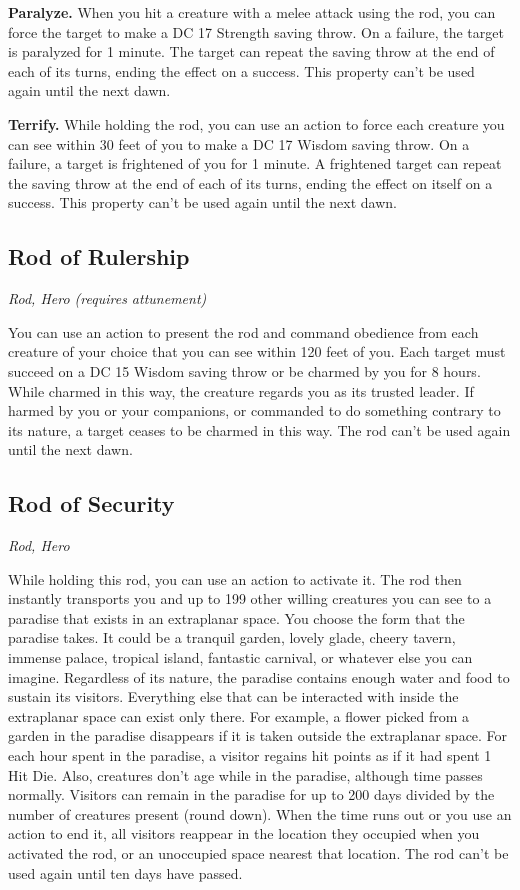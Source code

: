 \textbf{Paralyze.} When you hit a creature with a melee attack using the rod, you can force the target to make a DC 17 Strength saving throw. On a failure, the target is paralyzed for 1 minute. The target can repeat the saving throw at the end of each of its turns, ending the effect on a success. This property can't be used again until the next dawn.

\textbf{Terrify.} While holding the rod, you can use an action to force each creature you can see within 30 feet of you to make a DC 17 Wisdom saving throw. On a failure, a target is frightened of you for 1 minute. A frightened target can repeat the saving throw at the end of each of its turns, ending the effect on itself on a success. This property can't be used again until the next dawn.

\subsection{Rod of Rulership}
\textit{Rod, Hero (requires attunement)}

You can use an action to present the rod and command obedience from each creature of your choice that you can see within 120 feet of you. Each target must succeed on a DC 15 Wisdom saving throw or be charmed by you for 8 hours. While charmed in this way, the creature regards you as its
trusted leader. If harmed by you or your companions, or commanded to do something contrary to its nature, a target ceases to be charmed in this way. The rod can't be used again until the next dawn.

\subsection{Rod of Security}
\textit{Rod, Hero} 

While holding this rod, you can use an action to activate it. The rod then instantly transports you and up to 199 other willing creatures you can see to a paradise that exists in an extraplanar space. You choose the form that the paradise takes. It could be a tranquil garden, lovely glade, cheery tavern, immense palace, tropical island, fantastic carnival, or whatever else you can imagine. Regardless of its nature, the paradise contains enough water and food to sustain its visitors. Everything else that can be interacted with inside the extraplanar space can exist only there. For example, a flower picked from a garden in the paradise disappears if it is taken outside the extraplanar space.  For each hour spent in the paradise, a visitor regains hit points as if it had spent 1 Hit Die. Also, creatures don't age while in the paradise, although time passes normally. Visitors can remain in the paradise for up to 200 days divided by the number of creatures present (round down).  When the time runs out or you use an action to end it, all visitors reappear in the location they occupied when you activated the rod, or an unoccupied space nearest that location. The rod can't be used again until ten days have passed.


